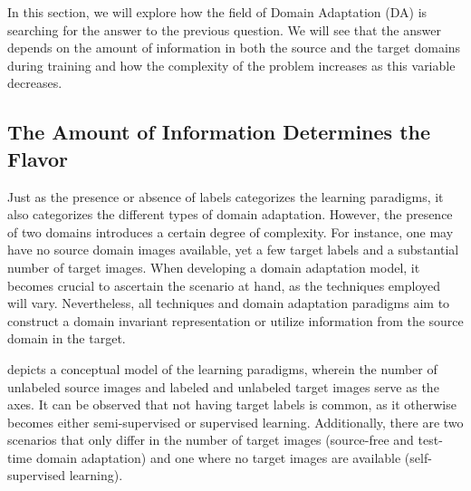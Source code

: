 In this section, we will explore how the field of Domain Adaptation (DA) is searching for the answer to the previous question. We will see that the answer depends on the amount of information in both the source and the target domains during training and how the complexity of the problem increases as this variable decreases.

\subsection{The Amount of Information Determines the Flavor}
Just as the presence or absence of labels categorizes the learning paradigms, it also categorizes the different types of domain adaptation. However, the presence of two domains introduces a certain degree of complexity. For instance, one may have no source domain images available, yet a few target labels and a substantial number of target images. When developing a domain adaptation model, it becomes crucial to ascertain the scenario at hand, as the techniques employed will vary. Nevertheless, all techniques and domain adaptation paradigms aim to construct a domain invariant representation or utilize information from the source domain in the target. 



 depicts a conceptual model of the learning paradigms, wherein the number of unlabeled source images and labeled and unlabeled target images serve as the axes. It can be observed that not having target labels is common, as it otherwise becomes either semi-supervised or supervised learning. Additionally, there are two scenarios that only differ in the number of target images (source-free and test-time domain adaptation) and one where no target images are available (self-supervised learning).

